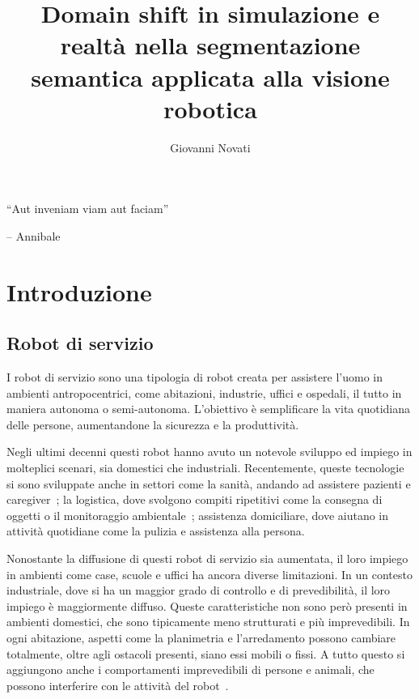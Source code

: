 \documentclass[12pt]{report}
\title{Domain shift in simulazione e realtà nella segmentazione semantica applicata alla visione robotica}
\author{Giovanni Novati}
\begin{document}
\makefrontpage

{\raggedleft \large \sl
	
	\vspace{2cm}
	
	``Aut inveniam viam aut faciam''
	
	\bigskip
	
	\--- Annibale\\}

\beforepreface

\afterpreface

\chapter{Introduzione}
\label{cap:introduzione}

\section{Robot di servizio}
\label{sec:robot_servizio}

I robot di servizio sono una tipologia di robot creata per assistere l'uomo in ambienti antropocentrici, come abitazioni, industrie, uffici e ospedali, il tutto in maniera autonoma o semi-autonoma. L'obiettivo è semplificare la vita quotidiana delle persone, aumentandone la sicurezza e la produttività.

Negli ultimi decenni questi robot hanno avuto un notevole sviluppo ed impiego in molteplici scenari, sia domestici che industriali. Recentemente, queste tecnologie si sono sviluppate anche in settori come la sanità, andando ad assistere pazienti e caregiver~\cite{robotics10010047}; la logistica, dove svolgono compiti ripetitivi come la consegna di oggetti o il monitoraggio ambientale~\cite{fragapane2021405}; assistenza domiciliare, dove aiutano in attività quotidiane come la pulizia e assistenza alla persona.

Nonostante la diffusione di questi robot di servizio sia aumentata, il loro impiego in ambienti come case, scuole e uffici ha ancora diverse limitazioni. In un contesto industriale, dove si ha un maggior grado di controllo e di prevedibilità, il loro impiego è maggiormente diffuso. Queste caratteristiche non sono però presenti in ambienti domestici, che sono tipicamente meno strutturati e più imprevedibili. In ogni abitazione, aspetti come la planimetria e l'arredamento possono cambiare totalmente, oltre agli ostacoli presenti, siano essi mobili o fissi. A tutto questo si aggiungono anche i comportamenti imprevedibili di persone e animali, che possono interferire con le attività del robot~\cite{6301139}.
\end{document}
